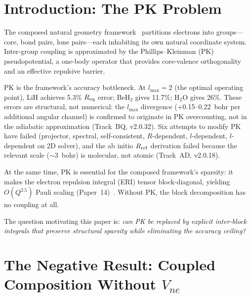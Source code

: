 \documentclass[aps,pra,twocolumn,superscriptaddress,longbibliography]{revtex4-2}
\begin{document}
\maketitle

\section{Introduction: The PK Problem}
\label{sec:intro}

The composed natural geometry framework~\cite{loutey_paper17}
partitions electrons into groups---core, bond pairs, lone pairs---each
inhabiting its own natural coordinate system.  Inter-group coupling is
approximated by the Phillips--Kleinman (PK) pseudopotential, a
one-body operator that provides core-valence orthogonality and an
effective repulsive barrier.

PK is the framework's accuracy bottleneck.  At $l_{\max} = 2$ (the
optimal operating point), LiH achieves 5.3\% $R_{\rm eq}$ error;
BeH$_2$ gives 11.7\%; H$_2$O gives 26\%.  These errors are
structural, not numerical: the $l_{\max}$ divergence
(+0.15--0.22~bohr per additional angular channel) is confirmed to
originate in PK overcounting, not in the adiabatic approximation
(Track~BQ, v2.0.32).  Six attempts to modify PK have failed
(projector, spectral, self-consistent, $R$-dependent, $l$-dependent,
$l$-dependent on 2D solver), and the ab initio $R_{\rm ref}$
derivation failed because the relevant scale (${\sim}3$~bohr) is
molecular, not atomic (Track~AD, v2.0.18).

At the same time, PK is essential for the composed framework's
sparsity: it makes the electron repulsion integral (ERI) tensor
block-diagonal, yielding $O(Q^{2.5})$ Pauli scaling
(Paper~14)~\cite{loutey_paper14}.  Without PK, the block
decomposition has no coupling at all.

The question motivating this paper is: \emph{can PK be replaced by
explicit inter-block integrals that preserve structural sparsity while
eliminating the accuracy ceiling?}


\section{The Negative Result: Coupled Composition Without $V_{ne}$}
\label{sec:negative}
\end{document}
